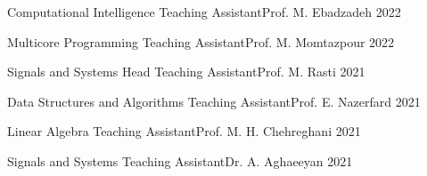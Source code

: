 
\newcommand{\taprefix}{Teaching Assistant{\enskip\cdotp\enskip}}

\begin{cvhonors}

  \cvhonor
    {Computational Intelligence} %
    {\taprefix Prof. M. Ebadzadeh} %
    {} %
    {2022} %

  \cvhonor
    {Multicore Programming} %
    {\taprefix Prof. M. Momtazpour} %
    {} %
    {2022} %

  \cvhonor
    {Signals and Systems} %
    {Head \taprefix Prof. M. Rasti} %
    {} %
    {2021} %

  \cvhonor
    {Data Structures and Algorithms} %
    {\taprefix Prof. E. Nazerfard} %
    {} %
    {2021} %

  \cvhonor
    {Linear Algebra} %
    {\taprefix Prof. M. H. Chehreghani} %
    {} %
    {2021} %

  \cvhonor
    {Signals and Systems} %
    {\taprefix Dr. A. Aghaeeyan} %
    {} %
    {2021} %

\end{cvhonors}
